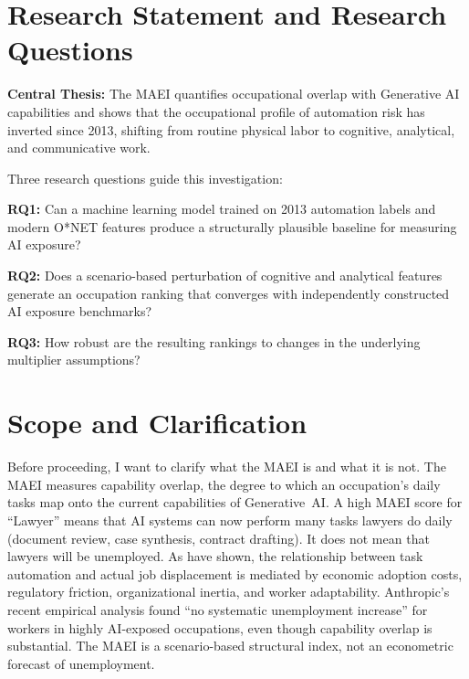 \section{Research Statement and Research Questions}
\label{sec:intro-rqs}

\textbf{Central Thesis:} The MAEI quantifies occupational overlap with
Generative AI capabilities and shows that the
occupational profile of automation risk has inverted since 2013, shifting
from routine physical labor to cognitive, analytical, and communicative work.

Three research questions guide this investigation:

\textbf{RQ1:} Can a machine learning model trained on 2013 automation labels
and modern O*NET features produce a structurally plausible baseline for
measuring AI exposure?

\textbf{RQ2:} Does a scenario-based perturbation of cognitive and analytical
features generate an occupation ranking that converges with independently
constructed AI exposure benchmarks?

\textbf{RQ3:} How robust are the resulting rankings to changes in the
underlying multiplier assumptions?

\section{Scope and Clarification}
\label{sec:intro-scope}

Before proceeding, I want to clarify what the MAEI is and what it is not.
The MAEI measures capability overlap, the degree to which an occupation's
daily tasks map onto the current capabilities of Generative~AI.  A high MAEI
score for ``Lawyer'' means that AI systems can now perform many tasks lawyers
do daily (document review, case synthesis, contract drafting).  It does not
mean that lawyers will be unemployed.  As \citet{Acemoglu_Restrepo_2018}
have shown, the relationship between task automation and actual job
displacement is mediated by economic adoption costs, regulatory friction,
organizational inertia, and worker adaptability.  Anthropic's
\citeyearpar{Anthropic_2026} recent empirical analysis found ``no systematic
unemployment increase'' for workers in highly AI-exposed occupations, even
though capability overlap is substantial.  The MAEI is a scenario-based
structural index, not an econometric forecast of unemployment.

